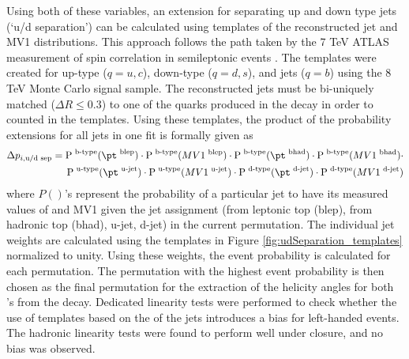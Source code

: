Using both of these variables, an extension for separating up and down type jets (`u/d separation') can be calculated using templates of the reconstructed jet \pt and MV1 distributions. This approach follows the path taken by the 7 TeV ATLAS measurement of spin correlation in semileptonic \ttbar events \cite{7tev_spin_ljets}. The templates were created for up-type ($q=u,c$), down-type ($q=d,s$), and \bt jets ($q=b$) using the 8 TeV \ttbar Monte Carlo signal sample. The reconstructed jets must be bi-uniquely matched ($\Delta R \leq 0.3$) to one of the quarks produced in the \ttbar decay in order to counted in the templates. Using these templates, the product of the probability extensions for all jets in one fit is formally given as 
\begin{eqnarray}
\Delta p_{i, \text{u/d sep}}= 
\text{P}^{\text{ b-type}}(\pt^{\text{ blep}})\cdot 
\text{P}^{\text{ b-type}}(MV1^{\text{ blep}})\cdot 
\text{P}^{\text{ b-type}}(\pt^{\text{ bhad}})\cdot
\text{P}^{\text{ b-type}}(MV1^{\text{ bhad}})\cdot\\
\text{P}^{\text{ u-type}}(\pt^{\text{ u-jet}})\cdot 
\text{P}^{\text{ u-type}}(MV1^{\text{ u-jet}})\cdot 
\text{P}^{\text{ d-type}}(\pt^{\text{ d-jet}})\cdot
\text{P}^{\text{ d-type}}(MV1^{\text{ d-jet}})
\label{eq:ud_pij}
\end{eqnarray}
where $P()$'s represent the probability of a particular jet to have its measured values of \pt and MV1 given the jet assignment (\bt from leptonic top (blep), \bt from hadronic top (bhad), u-jet, d-jet) in the current permutation. The individual jet weights are calculated using the templates in Figure \ref{fig:udSeparation_templates} normalized to unity. Using these weights, the event probability is calculated for each permutation. The permutation with the highest event probability is then chosen as the final permutation for the extraction of the helicity angles for both \w's from the \ttbar decay. Dedicated linearity tests were performed to check whether the use of templates based on the \pt of the jets introduces a bias for left-handed events. %
The hadronic linearity tests were found to perform well under closure, and no bias was observed.

